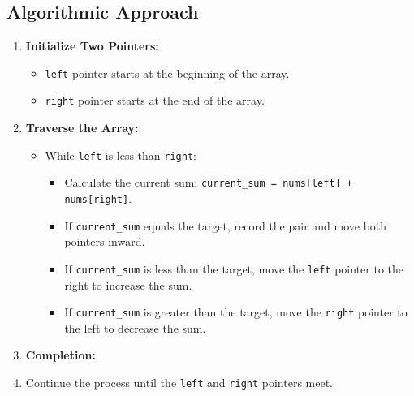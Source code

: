 \subsection*{Algorithmic Approach}
\begin{enumerate}
    \item \textbf{Initialize Two Pointers:}
        \begin{itemize}
            \item \texttt{left} pointer starts at the beginning of the array.
            \item \texttt{right} pointer starts at the end of the array.
        \end{itemize}
    \item \textbf{Traverse the Array:}
        \begin{itemize}
            \item While \texttt{left} is less than \texttt{right}:
                \begin{itemize}
                    \item Calculate the current sum: \texttt{current\_sum = nums[left] + nums[right]}.
                    \item If \texttt{current\_sum} equals the target, record the pair and move both pointers inward.
                    \item If \texttt{current\_sum} is less than the target, move the \texttt{left} pointer to the right to increase the sum.
                    \item If \texttt{current\_sum} is greater than the target, move the \texttt{right} pointer to the left to decrease the sum.
                \end{itemize}
        \end{itemize}
    \item \textbf{Completion:}
        \item Continue the process until the \texttt{left} and \texttt{right} pointers meet.
\end{enumerate}

